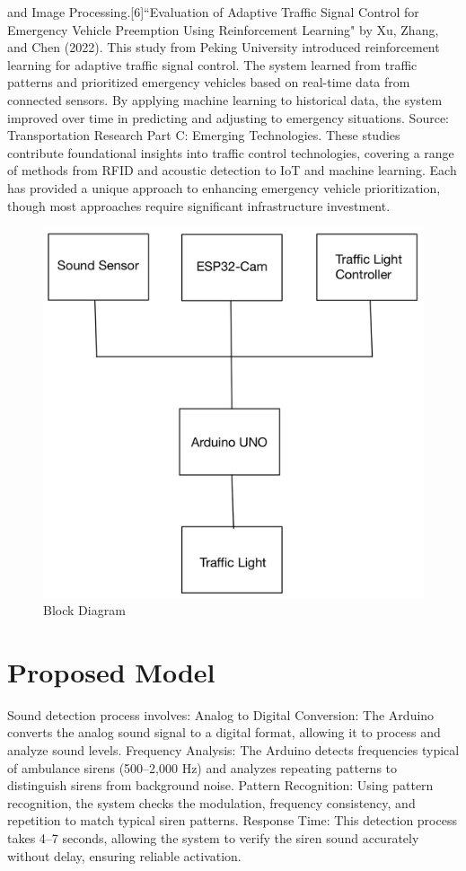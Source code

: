 \documentclass[conference]{IEEEtran}
\begin{document}
and Image Processing.[6]“Evaluation of Adaptive Traffic Signal Control for Emergency Vehicle Preemption Using Reinforcement Learning" by Xu, Zhang, and Chen (2022). This study from Peking University introduced reinforcement learning for adaptive traffic signal control. The system learned from traffic patterns and prioritized emergency vehicles based on real-time data from connected sensors. By applying machine learning to historical data, the system improved over time in predicting and adjusting to emergency situations. Source: Transportation Research Part C: Emerging Technologies.
These studies contribute foundational insights into traffic control technologies, covering a range of methods from RFID and acoustic detection to IoT and machine learning. Each has provided a unique approach to enhancing emergency vehicle prioritization, though most approaches require significant infrastructure investment.

\begin{figure}[htbp]
    \centering \includegraphics[width=1\linewidth]{block diagram.jpg}
    \caption{Block Diagram}
    \label{fig:enter-label}
\end{figure}


\section{Proposed Model}\label{AA}
Sound detection process involves:
Analog to Digital Conversion: The Arduino converts the analog sound signal to a digital format, allowing it to process and analyze sound levels.
Frequency Analysis: The Arduino detects frequencies typical of ambulance sirens (500–2,000 Hz) and analyzes repeating patterns to distinguish sirens from background noise.
Pattern Recognition: Using pattern recognition, the system checks the modulation, frequency consistency, and repetition to match typical siren patterns.
Response Time: This detection process takes 4–7 seconds, allowing the system to verify the siren sound accurately without delay, ensuring reliable activation.
\end{document}

